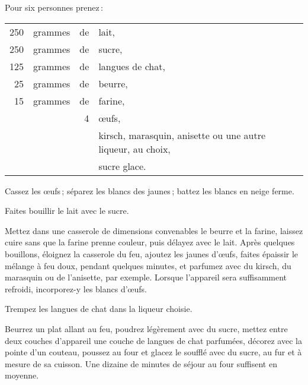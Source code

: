 Pour six personnes prenez :

\footnotesize
\begin{longtable}{rrrp{16em}}
    250 & grammes & de & lait,                                                                            \\
    250 & grammes & de & sucre,                                                                           \\
    125 & grammes & de & langues de chat,                                                                 \\
     25 & grammes & de & beurre,                                                                          \\
     15 & grammes & de & farine,                                                                          \\
        &         &  4 & œufs,                                                                            \\
        &         &    & kirsch, marasquin, anisette ou une autre liqueur, au choix,                      \\
        &         &    & sucre glace.                                                                     \\
\end{longtable}
\normalsize

Cassez les œufs ; séparez les blancs des jaunes ; battez les blancs en neige ferme.

Faites bouillir le lait avec le sucre.

Mettez dans une casserole de dimensions convenables le beurre et la farine,
laissez cuire sans que la farine prenne couleur, puis délayez avec le lait.
Après quelques bouillons, éloignez la casserole du feu, ajoutez les jaunes
d'œufs, faites épaissir le mélange à feu doux, pendant quelques minutes, et
parfumez avec du kirsch, du marasquin ou de l’anisette, par exemple. Lorsque
l'appareil sera suffisamment refroidi, incorporez-y les blancs d'œufs.

Trempez les langues de chat dans la liqueur choisie.

Beurrez un plat allant au feu, poudrez légèrement avec du sucre, mettez entre
deux couches d'appareil une couche de langues de chat parfumées, décorez avec
la pointe d'un couteau, poussez au four et glacez le soufflé avec du sucre, au
fur et à mesure de sa cuisson. Une dizaine de minutes de séjour au four
suffisent en moyenne.

